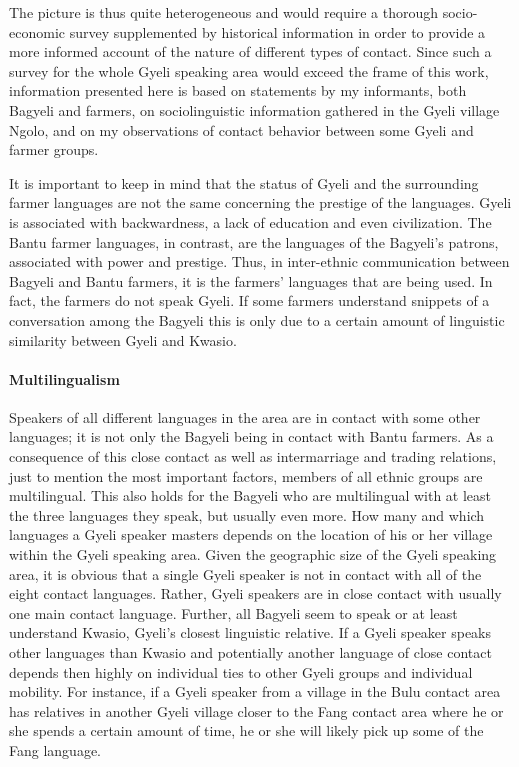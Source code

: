 The picture is thus quite heterogeneous and would require a thorough socio-economic survey supplemented by historical information in order to provide a more informed account of the nature of different types of contact. Since such a survey for the whole Gyeli speaking area would exceed the frame of this work, information presented here is based on statements by my informants, both Bagyeli and farmers, on sociolinguistic information gathered in the Gyeli village Ngolo, and on my observations of contact behavior between some Gyeli and farmer groups.

It is important to keep in mind that the status of Gyeli and the surrounding farmer languages are not the same concerning the prestige of the languages. Gyeli is associated with backwardness, a lack of education and even civilization. The Bantu farmer languages, in contrast, are the languages of the Bagyeli's patrons, associated with power and prestige. Thus, in inter-ethnic communication between Bagyeli and Bantu farmers, it is the farmers' languages that are being used. In fact, the farmers do not speak Gyeli. If some farmers understand snippets of a conversation among the Bagyeli this is only due to a certain amount of linguistic similarity between Gyeli and Kwasio.




\paragraph{Multilingualism} Speakers of all different languages in the area are in contact with some other languages; it is not only the Bagyeli being in contact with Bantu farmers. As a consequence of this close contact as well as intermarriage and trading relations, just to mention the most important factors, members of all ethnic groups are multilingual. This also holds for the Bagyeli who are multilingual with at least the three languages they speak, but usually even more. How many and which languages a Gyeli speaker masters depends on the location of his or her village within the Gyeli speaking area. Given the geographic size of the Gyeli speaking area, it is obvious that a single Gyeli speaker is not in contact with all of the eight contact languages. Rather, Gyeli speakers are in close contact with usually one main contact language. Further, all Bagyeli seem to speak or at least understand Kwasio, Gyeli's closest linguistic relative. If a Gyeli speaker speaks other languages than Kwasio and potentially another language of close contact depends then highly on individual ties to other Gyeli groups and individual mobility. For instance, if a Gyeli speaker from a village in the Bulu contact area has relatives in another Gyeli village closer to the Fang contact area where he or she spends a certain amount of time, he or she will likely pick up some of the Fang language.

